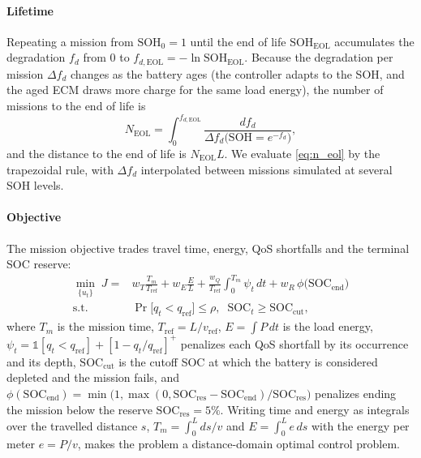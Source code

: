 \paragraph{Lifetime}
Repeating a mission from $\mathrm{SOH}_0 = 1$ until the end of life $\mathrm{SOH}_{\mathrm{EOL}}$
accumulates the degradation $f_d$ from 0 to $f_{d,\mathrm{EOL}} = -\ln \mathrm{SOH}_{\mathrm{EOL}}$.
Because the degradation per mission $\Delta f_d$ changes as the battery ages (the controller adapts
to the \ac{SOH}, and the aged \ac{ECM} draws more charge for the same load energy), the number of
missions to the end of life is
\begin{equation}
  N_{\mathrm{EOL}} = \int_0^{f_{d,\mathrm{EOL}}} \frac{df_d}{\Delta f_d\big(\mathrm{SOH} = e^{-f_d}\big)},
  \label{eq:n_eol}
\end{equation}
and the distance to the end of life is $N_{\mathrm{EOL}} L$. We evaluate \eqref{eq:n_eol} by the
trapezoidal rule, with $\Delta f_d$ interpolated between missions simulated at several \ac{SOH} levels.

\paragraph{Objective}
The mission objective trades travel time, energy, \ac{QoS} shortfalls and the terminal \ac{SOC} reserve:
\begin{equation}
\begin{aligned}
  \min_{\{u_t\}} \;
  J = {} & w_T \frac{T_m}{T_{\mathrm{ref}}}
    + w_E \frac{E}{L}
    + \frac{w_Q}{T_{\mathrm{ref}}} \int_0^{T_m} \psi_t\, dt
    + w_R \,\phi\big(\mathrm{SOC}_{\mathrm{end}}\big) \\
  \text{s.t.} \quad &
  \Pr\big[q_t < q_{\mathrm{ref}}\big] \leq \rho,\;\;
  \mathrm{SOC}_t \geq \mathrm{SOC}_{\mathrm{cut}},
\end{aligned}
  \label{eq:objective}
\end{equation}
where $T_m$ is the mission time, $T_{\mathrm{ref}} = L / v_{\mathrm{ref}}$, $E = \int P\,dt$ is the
load energy, $\psi_t = \mathbb{1}[q_t < q_{\mathrm{ref}}] + [1 - q_t/q_{\mathrm{ref}}]^+$ penalizes
each \ac{QoS} shortfall by its occurrence and its depth, $\mathrm{SOC}_{\mathrm{cut}}$ is the cutoff \ac{SOC} at which the battery
is considered depleted and the mission fails, and
$\phi(\mathrm{SOC}_{\mathrm{end}}) = \min\!\big(1, \max(0, \mathrm{SOC}_{\mathrm{res}} - \mathrm{SOC}_{\mathrm{end}}) / \mathrm{SOC}_{\mathrm{res}}\big)$
penalizes ending the mission below the reserve $\mathrm{SOC}_{\mathrm{res}} = 5\%$.
Writing time and energy as integrals over the travelled distance $s$,
$T_m = \int_0^L ds / v$ and $E = \int_0^L e\,ds$ with the energy per meter
$e = P / v$, makes the problem a distance-domain optimal control problem.

